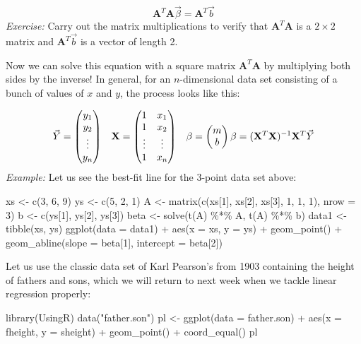 \documentclass[
  letterpaper,
  DIV=11,
  numbers=noendperiod]{scrreprt}
\newenvironment{Shaded}{\begin{snugshade}}{\end{snugshade}}
\newcommand{\NormalTok}[1]{\textcolor[rgb]{0.00,0.23,0.31}{#1}}
\begin{document}
\[
\mathbf{A}^T \mathbf{A} \vec \beta = \mathbf{A}^T \vec b
\] \emph{Exercise:} Carry out the matrix multiplications to verify that
\(\mathbf{A}^T \mathbf{A}\) is a \(2 \times 2\) matrix and
\(\mathbf{A}^T \vec b\) is a vector of length 2.

Now we can solve this equation with a square matrix
\(\mathbf{A}^T \mathbf{A}\) by multiplying both sides by the inverse! In
general, for an \(n\)-dimensional data set consisting of a bunch of
values of \(x\) and \(y\), the process looks like this:

\[
\vec Y = \begin{pmatrix} y_1\\ y_2\\ \vdots \\ y_n \end{pmatrix} \;\;\; 
\mathbf{X} = \begin{pmatrix} 1 & x_1\\ 1 & x_2\\ \vdots & \vdots \\ 1 & x_n \end{pmatrix}
 \;\;\; 
\mathbf{\beta} = \begin{pmatrix} m \\ b \end{pmatrix} \\
\beta = (\mathbf{X}^{T} \mathbf{X})^{-1} \mathbf{X}^{T}\vec Y
\] \emph{Example:} Let us see the best-fit line for the 3-point data set
above:

\begin{Shaded}
\begin{Highlighting}[]
\NormalTok{xs \textless{}{-} c(3, 6, 9)}
\NormalTok{ys \textless{}{-} c(5, 2, 1)}
\NormalTok{A \textless{}{-} matrix(c(xs[1], xs[2], xs[3], 1, 1, 1), nrow = 3)}
\NormalTok{b \textless{}{-} c(ys[1], ys[2], ys[3])}
\NormalTok{beta \textless{}{-} solve(t(A) \%*\% A, t(A) \%*\% b)}
\NormalTok{data1 \textless{}{-} tibble(xs, ys)}
\NormalTok{ggplot(data = data1) + }
\NormalTok{  aes(x = xs, y = ys) + }
\NormalTok{  geom\_point() + }
\NormalTok{  geom\_abline(slope = beta[1], intercept = beta[2])}
\end{Highlighting}
\end{Shaded}

Let us use the classic data set of Karl Pearson's from 1903 containing
the height of fathers and sons, which we will return to next week when
we tackle linear regression properly:

\begin{Shaded}
\begin{Highlighting}[]
\NormalTok{library(UsingR)}
\NormalTok{data("father.son")}
\NormalTok{pl \textless{}{-} ggplot(data = father.son) + }
\NormalTok{  aes(x = fheight, y = sheight) + }
\NormalTok{  geom\_point() + }
\NormalTok{  coord\_equal()}
\NormalTok{pl}
\end{Highlighting}
\end{Shaded}
\end{document}
